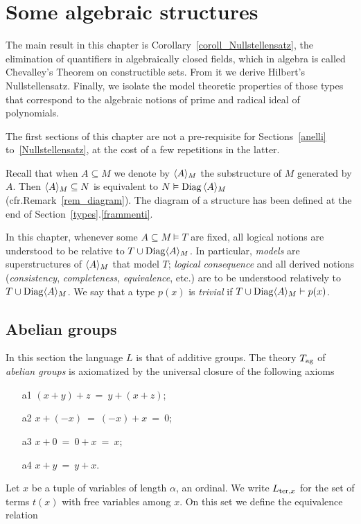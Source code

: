 \documentclass[creche.tex]{subfiles}
\begin{document}
\chapter{Some algebraic structures}
\label{algebraic}

\def\ceq#1#2#3{\parbox[b]{25ex}{$\displaystyle #1$}\parbox[b]{6ex}{\hfil$#2$}$\displaystyle #3$}

The main result in this chapter is Corollary~\ref{coroll_Nullstellensatz}, the elimination of quantifiers in algebraically closed fields, which in algebra is called Chevalley's Theorem on constructible sets. From it we derive Hilbert's Nullstellensatz. Finally, we isolate the model theoretic properties of those types that correspond to the algebraic notions of prime and radical ideal of polynomials.

The first sections of this chapter are not a pre-requisite for Sections~\ref{anelli} to~\ref{Nullstellensatz}, at the cost of a few repetitions in the latter.

\begin{notation}\label{notation1}
Recall that when $A\subseteq M$ we denote by \emph{$\langle A\rangle_M$\/} the substructure of $M$ generated by $A$. Then $\langle A\rangle_M\subseteq N$ is equivalent to $N\vDash {\rm Diag}\,\langle A\rangle_M$ (cfr.\@ Remark~\ref{rem_diagram}). The diagram of a structure has been defined at the end of Section~\ref{types}.\ref{frammenti}.

In this chapter, whenever some $A\subseteq M\models T$ are fixed, all logical notions are understood to be relative to $T\cup{\rm Diag}\langle A\rangle_M$. In particular, \textit{models\/} are superstructures of $\langle A\rangle_M$ that model $T$; \textit{logical consequence\/} and all derived notions (\textit{consistency}, \textit{completeness}, \textit{equivalence}, etc.) are to be understood relatively to $T\cup{\rm Diag}\langle A\rangle_M$. We say that a type $p(x)$ is \emph{trivial\/} if $T\cup{\rm Diag}\langle A\rangle_M\vdash p(x)$.\QED
\end{notation}

\section{Abelian groups}
\label{gruppi}
In this section the language $L$ is that of additive groups. The theory \emph{$T_{\rm ag}$} of \emph{abelian groups\/} is axiomatized by the universal closure of the following axioms
\begin{itemize}
\item[a1] $(x+y) +z\ =\ y+(x+z)$;
\item[a2] $x+(-x)\ =\ (-x)+x\ =\ 0$;
\item[a3] $x+0\ = \ 0+x\ = \ x$;
\item[a4] $x+y\ =\ y+x$.
\end{itemize}
Let $x$ be a tuple of variables of length $\alpha$, an ordinal. We write $L_{{\rm ter},x}$ for the set of terms $t(x)$ with free variables among $x$. On this set we define the equivalence relation
\end{document}
